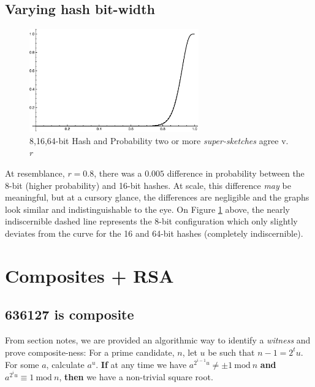 \documentclass[conference]{styles/acmsiggraph}
\newcommand{\?}{\stackrel{?}{=}}
\begin{document}
\subsection{Varying hash bit-width}
\begin{figure}[h!]
    \centering
    \includegraphics[width=0.65\textwidth]{Problem3Figs/comparison.png}
    \caption{8,16,64-bit Hash and Probability two or more \textit{super-sketches} agree v. $r$}
    \label{fig:comparison}
\end{figure}
\FloatBarrier
At resemblance, $r = 0.8$, there was a $0.005$ difference in probability between the 8-bit (higher probability) and 16-bit hashes.  At scale, this difference \textit{may} be meaningful, but at a cursory glance, the differences are negligible and the graphs look similar and indistinguishable to the eye.  On Figure \ref{fig:comparison} above, the nearly indiscernible dashed line represents the 8-bit configuration which only slightly deviates from the curve for the 16 and 64-bit hashes (completely indiscernible).

\newpage

\section{Composites + RSA}

\subsection{636127 is composite}
From section notes, we are provided an algorithmic way to identify a \textit{witness} and prove composite-ness:  For a prime candidate, $n$, let $u$ be such that $n-1 = 2^t u$.  For some $a$, calculate $a^u$.  \textbf{If} at any time we have $a^{2^{i-1} u} \neq \pm 1\  \text{mod}\  n$ \textbf{and} $a^{2^i u} \equiv 1\  \text{mod}\  n$, \textbf{then} we have a non-trivial square root. \\
\end{document}
